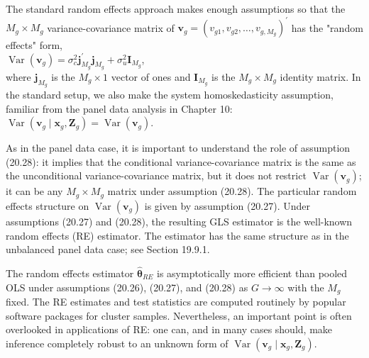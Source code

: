 \documentclass[10pt]{article}
\begin{document}
The standard random effects approach makes enough assumptions so that the $M_{g} \times M_{g}$ variance-covariance matrix of $\mathbf{v}_{g}=\left(v_{g 1}, v_{g 2}, \ldots, v_{g, M_{g}}\right)^{\prime}$ has the "random effects" form,\\
$\operatorname{Var}\left(\mathbf{v}_{g}\right)=\sigma_{c}^{2} \mathbf{j}_{M_{g}}^{\prime} \mathbf{j}_{M_{g}}+\sigma_{u}^{2} \mathbf{I}_{M_{g}}$,\\
where $\mathbf{j}_{M_{g}}$ is the $M_{g} \times 1$ vector of ones and $\mathbf{I}_{M_{g}}$ is the $M_{g} \times M_{g}$ identity matrix. In the standard setup, we also make the system homoskedasticity assumption, familiar from the panel data analysis in Chapter 10:\\
$\operatorname{Var}\left(\mathbf{v}_{g} \mid \mathbf{x}_{g}, \mathbf{Z}_{g}\right)=\operatorname{Var}\left(\mathbf{v}_{g}\right)$.

As in the panel data case, it is important to understand the role of assumption (20.28): it implies that the conditional variance-covariance matrix is the same as the unconditional variance-covariance matrix, but it does not restrict $\operatorname{Var}\left(\mathbf{v}_{g}\right)$; it can be any $M_{g} \times M_{g}$ matrix under assumption (20.28). The particular random effects structure on $\operatorname{Var}\left(\mathbf{v}_{g}\right)$ is given by assumption (20.27). Under assumptions (20.27) and (20.28), the resulting GLS estimator is the well-known random effects (RE) estimator. The estimator has the same structure as in the unbalanced panel data case; see Section 19.9.1.

The random effects estimator $\hat{\boldsymbol{\theta}}_{R E}$ is asymptotically more efficient than pooled OLS under assumptions (20.26), (20.27), and (20.28) as $G \rightarrow \infty$ with the $M_{g}$ fixed. The RE estimates and test statistics are computed routinely by popular software packages for cluster samples. Nevertheless, an important point is often overlooked in applications of RE: one can, and in many cases should, make inference completely robust to an unknown form of $\operatorname{Var}\left(\mathbf{v}_{g} \mid \mathbf{x}_{g}, \mathbf{Z}_{g}\right)$.
\end{document}
